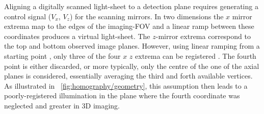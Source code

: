 Aligning a digitally scanned light-sheet to a detection plane requires generating %
a control signal ($V_x$, $V_z$) for the scanning mirrors.
In two dimensions the \(x\) mirror extrema map to the edges of the imaging-\gls{FOV} and a linear ramp between these coordinates produces a virtual light-sheet.
The \(z\)-mirror extrema correspond to the top and bottom observed image planes.
However, using linear ramping from a starting point%
, only three of the four $x$ $z$ extrema %
can be registered
\cite{zitova_image_2003-1}.
The fourth point is either discarded, or more typically, only the centre of the one of the axial planes is considered, essentially averaging the third and forth available vertices. %
As illustrated in \figurename~\ref{fig:homography/geometry}, this assumption then leads to a poorly-registered illumination in the plane where the fourth coordinate was neglected and greater  in \gls{3D} imaging.%


